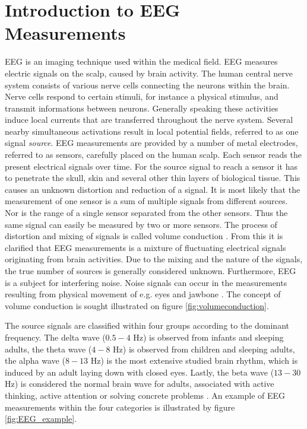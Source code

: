 \section{Introduction to EEG Measurements}\label{sec:EEG}
EEG is an imaging technique used within the medical field. EEG measures electric signals on the scalp, caused by brain activity. 
The human central nerve system consists of various nerve cells connecting the neurons within the brain. Nerve cells respond to certain stimuli, for instance a physical stimulus, and transmit informations between neurons.
Generally speaking these activities induce local currents that are transferred throughout the nerve system. 
Several nearby simultaneous activations result in local potential fields, referred to as one signal \textit{source}\cite{EEGsignalprocessing}. 
EEG measurements are provided by a number of metal electrodes, referred to as sensors, carefully placed on the human scalp. 
Each sensor reads the present electrical signals over time.
For the source signal to reach a sensor it has to penetrate the skull, skin and several other thin layers of biological tissue. 
This causes an unknown distortion and reduction of a signal.
It is most likely that the measurement of one sensor is a sum of multiple signals from different sources.
Nor is the range of a single sensor separated from the other sensors. 
Thus the same signal can easily be measured by two or more sensors.
The process of distortion and mixing of signals is called volume conduction \cite[p. 68]{EEGsignalprocessing} \cite{Van2019}. 
From this it is clarified that EEG measurements is a mixture of fluctuating electrical signals originating from brain activities. Due to the mixing and the nature of the signals, the true number of sources is generally considered unknown\cite{EEGsignalprocessing}. 
Furthermore, EEG is a subject for interfering noise. Noise signals can occur in the measurements resulting from physical movement of e.g. eyes and jawbone \cite{fundamentalEEG}. The concept of volume conduction is sought illustrated on figure \ref{fig:volumeconduction}.

The source signals are classified within four groups according to the dominant frequency. 
The delta wave ($0.5-4$ Hz) is observed from infants and sleeping adults, the theta wave ($4-8$ Hz) is observed from children and sleeping adults, the alpha wave ($8-13$ Hz) is the most extensive studied brain rhythm, which is induced by an adult laying down with closed eyes. 
Lastly, the beta wave ($13-30$ Hz) is considered the normal brain wave for adults, associated with active thinking, active attention or solving concrete problems \cite[p. 11]{EEGsignalprocessing}. 
An example of EEG measurements within the four categories is illustrated by figure \ref{fig:EEG_example}.   

